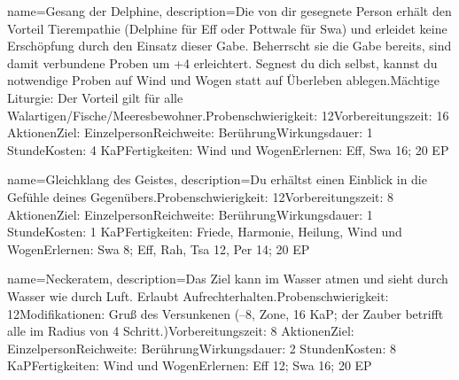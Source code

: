 {
    name={Gesang der Delphine},
    description={Die von dir gesegnete Person erhält den Vorteil Tierempathie (Delphine für Eff oder Pottwale für Swa) und erleidet keine Erschöpfung durch den Einsatz dieser Gabe. Beherrscht sie die Gabe bereits, sind damit verbundene Proben um +4 erleichtert. Segnest du dich selbst, kannst du notwendige Proben auf Wind und Wogen statt auf Überleben ablegen.\newline Mächtige Liturgie: Der Vorteil gilt für alle Walartigen/Fische/Meeresbewohner.\newline Probenschwierigkeit: 12\newline Vorbereitungszeit: 16 Aktionen\newline Ziel: Einzelperson\newline Reichweite: Berührung\newline Wirkungsdauer: 1 Stunde\newline Kosten: 4 KaP\newline Fertigkeiten: Wind und Wogen\newline Erlernen: Eff, Swa 16; 20 EP}
}


{
    name={Gleichklang des Geistes},
    description={Du erhältst einen Einblick in die Gefühle deines Gegenübers.\newline Probenschwierigkeit: 12\newline Vorbereitungszeit: 8 Aktionen\newline Ziel: Einzelperson\newline Reichweite: Berührung\newline Wirkungsdauer: 1 Stunde\newline Kosten: 1 KaP\newline Fertigkeiten: Friede, Harmonie, Heilung, Wind und Wogen\newline Erlernen: Swa 8; Eff, Rah, Tsa 12, Per 14; 20 EP}
}


{
    name={Neckeratem},
    description={Das Ziel kann im Wasser atmen und sieht durch Wasser wie durch Luft. Erlaubt Aufrechterhalten.\newline Probenschwierigkeit: 12\newline Modifikationen: Gruß des Versunkenen (–8, Zone, 16 KaP; der Zauber betrifft alle im Radius von 4 Schritt.)\newline Vorbereitungszeit: 8 Aktionen\newline Ziel: Einzelperson\newline Reichweite: Berührung\newline Wirkungsdauer: 2 Stunden\newline Kosten: 8 KaP\newline Fertigkeiten: Wind und Wogen\newline Erlernen: Eff 12; Swa 16; 20 EP}
}


